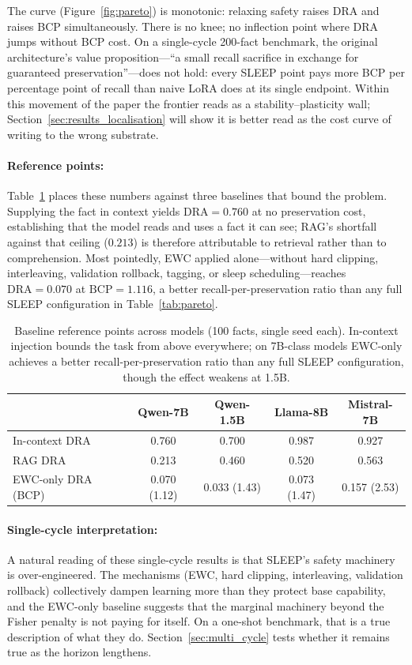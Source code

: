 The curve (Figure~\ref{fig:pareto}) is monotonic: relaxing safety raises DRA and raises BCP simultaneously. There is no knee; no inflection point where DRA jumps without BCP cost. On a single-cycle 200-fact benchmark, the original architecture's value proposition---``a small recall sacrifice in exchange for guaranteed preservation''---does not hold: every SLEEP point pays more BCP per percentage point of recall than naive LoRA does at its single endpoint. Within this movement of the paper the frontier reads as a stability--plasticity wall; Section~\ref{sec:results_localisation} will show it is better read as the cost curve of writing to the wrong substrate.

\paragraph{Reference points:} Table~\ref{tab:baselines} places these numbers against three baselines that bound the problem. Supplying the fact in context yields $\mathrm{DRA} = 0.760$ at no preservation cost, establishing that the model reads and uses a fact it can see; RAG's shortfall against that ceiling ($0.213$) is therefore attributable to retrieval rather than to comprehension. Most pointedly, EWC applied alone---without hard clipping, interleaving, validation rollback, tagging, or sleep scheduling---reaches $\mathrm{DRA} = 0.070$ at $\mathrm{BCP} = 1.116$, a better recall-per-preservation ratio than any full SLEEP configuration in Table~\ref{tab:pareto}.

\begin{table}[t]
\centering
\caption{Baseline reference points across models (100 facts, single seed each). In-context injection bounds the task from above everywhere; on 7B-class models EWC-only achieves a better recall-per-preservation ratio than any full SLEEP configuration, though the effect weakens at 1.5B.}
\label{tab:baselines}
\begin{tabular}{lcccc}
\toprule
& Qwen-7B & Qwen-1.5B & Llama-8B & Mistral-7B \\
\midrule
In-context DRA & 0.760 & 0.700 & 0.987 & 0.927 \\
RAG DRA        & 0.213 & 0.460 & 0.520 & 0.563 \\
EWC-only DRA (BCP) & 0.070 (1.12) & 0.033 (1.43) & 0.073 (1.47) & 0.157 (2.53) \\
\bottomrule
\end{tabular}
\end{table}

\paragraph{Single-cycle interpretation:} A natural reading of these single-cycle results is that SLEEP's safety machinery is over-engineered. The mechanisms (EWC, hard clipping, interleaving, validation rollback) collectively dampen learning more than they protect base capability, and the EWC-only baseline suggests that the marginal machinery beyond the Fisher penalty is not paying for itself. On a one-shot benchmark, that is a true description of what they do. Section~\ref{sec:multi_cycle} tests whether it remains true as the horizon lengthens.

